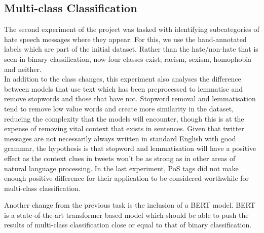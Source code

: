 \documentclass[conference]{IEEEtran}
\begin{document}
\subsection{Multi-class Classification}
The second experiment of the project was tasked with identifying subcategories of hate speech messages where they appear. For this, we use the hand-annotated labels which are part of the initial dataset. Rather than the hate/non-hate that is seen in binary classification, now four classes exist; racism, sexism, homophobia and neither.\\
In addition to the class changes, this experiment also analyses the difference between models that use text which has been preprocessed to lemmatise and remove stopwords and those that have not. Stopword removal and lemmatisation tend to remove low value words and create more similarity in the dataset, reducing the complexity that the models will encounter, though this is at the expense of removing vital context that exists in sentences. Given that twitter messages are not necessarily always written in standard English with good grammar, the hypothesis is that stopword and lemmatisation will have a positive effect as the context clues in tweets won't be as strong as in other areas of natural language processing. In the last experiment, PoS tags did not make enough positive difference for their application to be considered worthwhile for multi-class classification.

Another change from the previous task is the inclusion of a BERT model. BERT is a state-of-the-art transformer\cite{6} based model which should be able to push the results of multi-class classification close or equal to that of binary classification.
\end{document}
